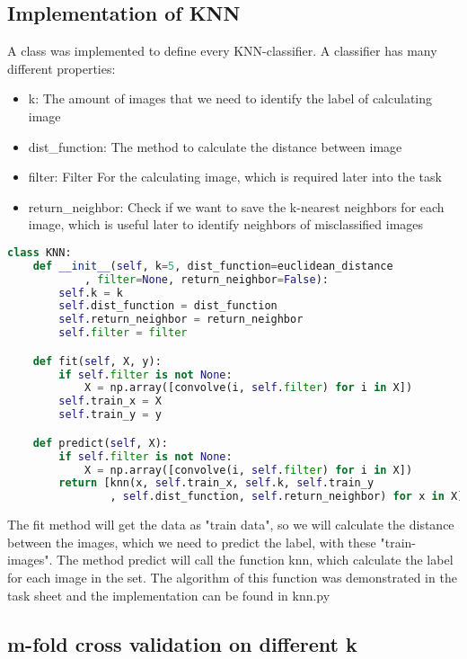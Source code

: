 \documentclass[11pt]{article}
\begin{document}
\subsection{Implementation of KNN}

A class was implemented to define every KNN-classifier. A classifier has many different properties:
\begin{itemize}
    \item k: The amount of images that we need to identify the label of calculating image
    \item dist\_function: The method to calculate the distance between image
    \item filter: Filter For the calculating image, which is required later into the task
    \item return\_neighbor: Check if we want to save the k-nearest neighbors for each image, which is useful later to identify neighbors of misclassified images
\end{itemize}

\begin{lstlisting}[language=Python, caption=KNN class]
class KNN:
    def __init__(self, k=5, dist_function=euclidean_distance
            , filter=None, return_neighbor=False):
        self.k = k
        self.dist_function = dist_function
        self.return_neighbor = return_neighbor
        self.filter = filter

    def fit(self, X, y):
        if self.filter is not None:
            X = np.array([convolve(i, self.filter) for i in X])
        self.train_x = X
        self.train_y = y

    def predict(self, X):
        if self.filter is not None:
            X = np.array([convolve(i, self.filter) for i in X])
        return [knn(x, self.train_x, self.k, self.train_y
                , self.dist_function, self.return_neighbor) for x in X]
\end{lstlisting}


The fit method will get the data as "train data", so we will calculate the distance between the images, which we need to predict the label, with these "train-images". The method predict will call the function knn, which calculate the label for each image in the set. The algorithm of this function was demonstrated in the task sheet and the implementation can be found in knn.py

\subsection{m-fold cross validation on different k}
\end{document}
